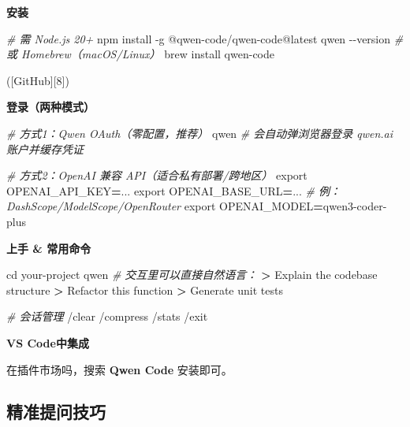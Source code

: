 \documentclass[
  twoside]{book}
\newenvironment{Shaded}{\begin{snugshade}}{\end{snugshade}}
\newcommand{\AttributeTok}[1]{\textcolor[rgb]{0.13,0.29,0.53}{#1}}
\newcommand{\BuiltInTok}[1]{#1}
\newcommand{\CommentTok}[1]{\textcolor[rgb]{0.56,0.35,0.01}{\textit{#1}}}
\newcommand{\ExtensionTok}[1]{#1}
\newcommand{\NormalTok}[1]{#1}
\newcommand{\OperatorTok}[1]{\textcolor[rgb]{0.81,0.36,0.00}{\textbf{#1}}}
\newcommand{\VariableTok}[1]{\textcolor[rgb]{0.00,0.00,0.00}{#1}}
\begin{document}
\textbf{安装}

\begin{Shaded}
\begin{Highlighting}[]
\CommentTok{\# 需 Node.js 20+}
\ExtensionTok{npm}\NormalTok{ install }\AttributeTok{{-}g}\NormalTok{ @qwen{-}code/qwen{-}code@latest}
\ExtensionTok{qwen} \AttributeTok{{-}{-}version}
\CommentTok{\# 或 Homebrew（macOS/Linux）}
\ExtensionTok{brew}\NormalTok{ install qwen{-}code}
\end{Highlighting}
\end{Shaded}

({[}GitHub{]}{[}8{]})

\textbf{登录（两种模式）}

\begin{Shaded}
\begin{Highlighting}[]
\CommentTok{\# 方式1：Qwen OAuth（零配置，推荐）}
\ExtensionTok{qwen}    \CommentTok{\# 会自动弹浏览器登录 qwen.ai 账户并缓存凭证}

\CommentTok{\# 方式2：OpenAI 兼容 API（适合私有部署/跨地区）}
\BuiltInTok{export} \VariableTok{OPENAI\_API\_KEY}\OperatorTok{=}\NormalTok{...}
\BuiltInTok{export} \VariableTok{OPENAI\_BASE\_URL}\OperatorTok{=}\NormalTok{...    }\CommentTok{\# 例：DashScope/ModelScope/OpenRouter}
\BuiltInTok{export} \VariableTok{OPENAI\_MODEL}\OperatorTok{=}\NormalTok{qwen3{-}coder{-}plus}
\end{Highlighting}
\end{Shaded}

\textbf{上手 \& 常用命令}

\begin{Shaded}
\begin{Highlighting}[]
\BuiltInTok{cd}\NormalTok{ your{-}project}
\ExtensionTok{qwen}
\CommentTok{\# 交互里可以直接自然语言：}
\OperatorTok{\textgreater{}}\NormalTok{ Explain }\ExtensionTok{the}\NormalTok{ codebase structure}
\OperatorTok{\textgreater{}}\NormalTok{ Refactor }\ExtensionTok{this}\NormalTok{ function}
\OperatorTok{\textgreater{}}\NormalTok{ Generate }\ExtensionTok{unit}\NormalTok{ tests}

\CommentTok{\# 会话管理}
\ExtensionTok{/clear}\NormalTok{   /compress   /stats   /exit}
\end{Highlighting}
\end{Shaded}

\textbf{VS Code中集成}

在插件市场吗，搜索 \textbf{Qwen Code} 安装即可。

\hypertarget{ux7cbeux51c6ux63d0ux95eeux6280ux5de7}{%
\subsection{精准提问技巧}\label{ux7cbeux51c6ux63d0ux95eeux6280ux5de7}}
\end{document}
